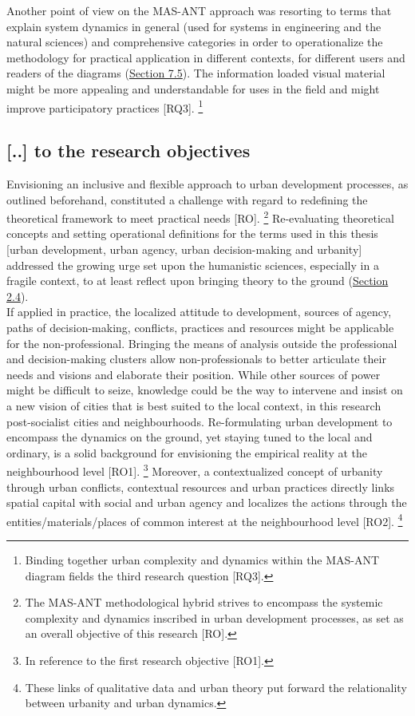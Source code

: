 \documentclass[11pt]{report}
\begin{document}
{{{Another point of view on the MAS-ANT approach was resorting to terms that explain system dynamics in general (used for systems in engineering and the natural sciences) and comprehensive categories in order to operationalize the methodology for practical application in different contexts, for different users and readers of the diagrams  (\href{Section 7.5}{Section 7.5}).
The information loaded visual material might be more appealing and understandable for uses in the field and might improve participatory practices [RQ3].
\footnote{Binding together urban complexity and dynamics within the MAS-ANT diagram fields the third research question [RQ3].}

\subsection{[..] to the research objectives}

Envisioning an inclusive and flexible approach to  urban development processes, as outlined beforehand, constituted a challenge with regard to redefining the theoretical framework to meet practical needs [RO].
\footnote{The MAS-ANT methodological hybrid strives to encompass the systemic complexity and dynamics inscribed in urban development processes, as set as an overall objective of this research [RO].}
Re-evaluating theoretical concepts and setting operational definitions for the terms used in this thesis [urban development, urban agency, urban decision-making and urbanity] addressed the growing urge set upon the humanistic sciences, especially in a fragile context, to at least reflect upon bringing theory to the ground (\href{Section 2.4}{Section 2.4}).
\\

If applied in practice, the localized attitude to development, sources of agency, paths of decision-making, conflicts, practices and resources might be applicable for the non-professional. Bringing the means of analysis outside the professional and decision-making clusters allow non-professionals to better articulate their needs and visions and elaborate their position. 
While other sources of power might be difficult to seize, knowledge could be the way to intervene and insist on a new vision of cities that is best suited to the local context, in this research post-socialist cities and neighbourhoods.
Re-formulating urban development to encompass the dynamics on the ground, yet staying tuned to the local and ordinary, is a solid background for envisioning the empirical reality at the neighbourhood level [RO1].
\footnote{In reference to the first research objective [RO1].}
Moreover, a contextualized concept of urbanity through urban conflicts, contextual resources and urban practices directly links spatial capital with social and urban agency and localizes the actions through the entities/materials/places of common interest at the neighbourhood level [RO2].
\footnote{These links of qualitative data and urban theory put forward the relationality between urbanity and urban dynamics.}
\\

}}}
\end{document}
